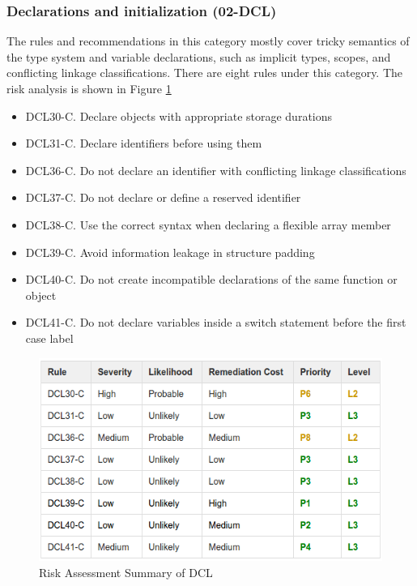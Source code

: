 \subsubsection{Declarations and initialization (02-DCL)}
 The rules and recommendations in this category mostly cover tricky semantics of the type system and variable declarations, such as implicit types, scopes, and conflicting linkage classifications. There are eight rules under this category. The risk analysis is shown in Figure \ref{fig:3}\cite{cert-c}
 \begin{itemize}
 	\item DCL30-C. Declare objects with appropriate storage durations

\item DCL31-C. Declare identifiers before using them

\item DCL36-C. Do not declare an identifier with conflicting linkage classifications

\item DCL37-C. Do not declare or define a reserved identifier

\item DCL38-C. Use the correct syntax when declaring a flexible array member

\item DCL39-C. Avoid information leakage in structure padding

\item DCL40-C. Do not create incompatible declarations of the same function or object

\item DCL41-C. Do not declare variables inside a switch statement before the first case label
\end{itemize}
\begin{figure}[H]
	
	
	\centering
	\includegraphics[width=.6\linewidth]{Figures/dcl}
	\caption{Risk Assessment Summary of DCL}
	\label{fig:3}
	
\end{figure}
